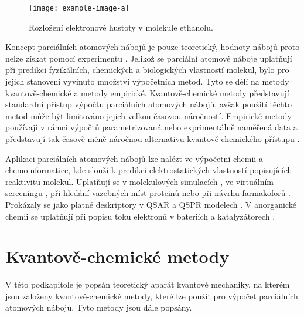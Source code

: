 \bigskip
\begin{figure}[h]
\begin{center}
\texttt{[image: example-image-a]}
\caption{Rozložení elektronové hustoty v molekule ethanolu.}
\end{center}
\end{figure}
Koncept parciálních atomových nábojů je pouze teoretický, hodnoty nábojů proto nelze získat pomocí experimentu \cite{Leach}. Jelikož se parciální atomové náboje uplatňují při predikci fyzikálních, chemických a biologických vlastností molekul, bylo pro jejich stanovení vyvinuto množství výpočetních metod. Tyto se dělí na metody kvantově-chemi\-cké a metody empirické. Kvantově-chemické metody představují standardní přístup výpočtu parciálních atomových nábojů,  avšak použití těchto metod může být limitováno jejich velkou časovou náročností. Empirické metody používají v rámci výpočtů parametrizovaná nebo exprimentálně naměřená data a představují tak časově méně náročnou alternativu kvantově-chemického přístupu \cite{Gasteiger:Textbook}. 

Aplikaci parciálních atomových nábojů lze nalézt ve výpočetní chemii a chemoinformatice, kde slouží k predikci elektrostatických vlastností popisujících reaktivitu molekul. Uplatňují se v molekulových simulacích \cite{molsimul}, ve virtuálním screeningu \cite{virtscreen}, při hledání vazebných míst proteinů nebo při návrhu farmakoforů \cite{farmak}. Prokázaly se jako platné deskriptory v QSAR a QSPR modelech \cite{Ghaf:QSAR, QSPR2}. V anorganické chemii se uplatňují při popisu toku elektronů v bateriích a katalyzátorech \cite{innorg}. 

\section{Kvantově-chemické metody}
V této podkapitole je popsán teoretický aparát kvantové mechaniky, na kterém jsou založeny kvantově-chemické metody, které lze použít pro výpočet parciálních atomových nábojů. Tyto metody jsou dále popsány. 

